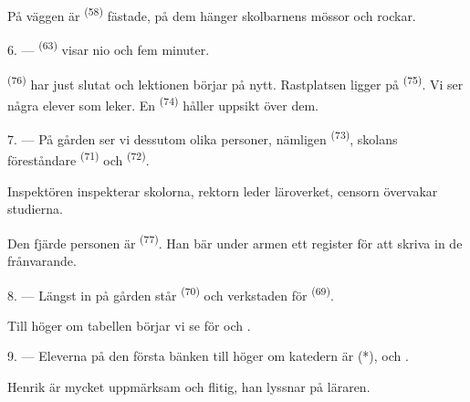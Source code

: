 På väggen är  \textsuperscript{(58)} fästade, på dem hänger skolbarnens
mössor och rockar.

\VUsaut{5.2mm}
\VUsaut{3.6mm}

6. ---  \textsuperscript{(63)} visar nio och fem minuter.

 \textsuperscript{(76)} har just slutat och lektionen börjar på
nytt. Rastplatsen ligger på  \textsuperscript{(75)}. Vi ser några elever som
leker. En  \textsuperscript{(74)} håller uppsikt över dem.

7. --- På gården ser vi dessutom olika personer, nämligen 
\textsuperscript{(73)}, skolans föreståndare  \textsuperscript{(71)} och
 \textsuperscript{(72)}.

Inspektören inspekterar skolorna, rektorn leder läroverket, censorn övervakar studierna.

Den fjärde personen är  \textsuperscript{(77)}. Han bär under armen ett
register för att skriva in de frånvarande.

8. --- Längst in på gården står  \textsuperscript{(70)} och
verkstaden för  \textsuperscript{(69)}.

Till höger om tabellen börjar vi se  för  och
.


\VUsaut{2.4mm}

\VUsaut{3.0mm}

9. --- Eleverna på den första bänken till höger om katedern är  (*),
 och .

Henrik är mycket uppmärksam och flitig, han lyssnar på läraren.

